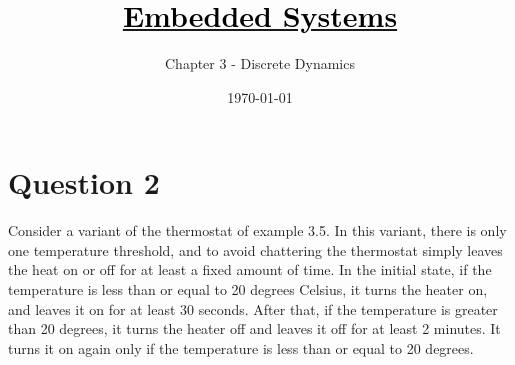 \documentclass[12pt]{article}
\title{\href{https://github.com/M-Sc-AUT/M.Sc-Computer-Architecture/tree/main/Embedded Systems Modeling and Design}{\textcolor{black}{Embedded Systems}}}
\subtitle{Chapter 3 - Discrete Dynamics}
\date{\today}
\begin{document}
\maketitlepage
\maketitlestart

\section{Question 2}

Consider a variant of the thermostat of example 3.5. In this variant, there is only one
temperature threshold, and to avoid chattering the thermostat simply leaves the heat
on or off for at least a fixed amount of time. In the initial state, if the temperature is
less than or equal to 20 degrees Celsius, it turns the heater on, and leaves it on for
at least 30 seconds. After that, if the temperature is greater than 20 degrees, it turns
the heater off and leaves it off for at least 2 minutes. It turns it on again only if the
temperature is less than or equal to 20 degrees.
\end{document}
